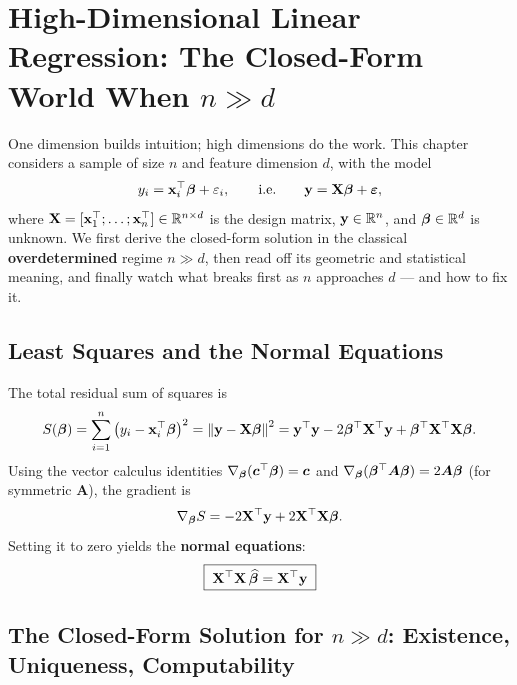 \section[High dimensions: the closed-form world]{High-Dimensional Linear Regression: The Closed-Form World When $n \gg d$}\label{sec:highdim}

One dimension builds intuition; high dimensions do the work. This chapter considers a sample of size $n$ and feature dimension $d$, with the model
\begin{equation}\label{eq:hd-model}
  y_i = \mathbf{x}_i^\top \bm{\beta} + \varepsilon_i,
  \qquad \text{i.e.} \qquad
  \mathbf{y} = \mathbf{X} \bm{\beta} + \bm{\varepsilon},
\end{equation}
where $\mathbf{X} = [\mathbf{x}_1^\top; \dots; \mathbf{x}_n^\top] \in \mathbb{R}^{n \times d}$ is the design matrix, $\mathbf{y} \in \mathbb{R}^n$, and $\bm{\beta} \in \mathbb{R}^d$ is unknown. We first derive the closed-form solution in the classical \textbf{overdetermined} regime $n \gg d$, then read off its geometric and statistical meaning, and finally watch what breaks first as $n$ approaches $d$ — and how to fix it.

\subsection{Least Squares and the Normal Equations}\label{sec:hd-ls}

The total residual sum of squares is
\begin{equation}\label{eq:hd-rss}
  S(\bm{\beta}) = \sum_{i=1}^n \big( y_i - \mathbf{x}_i^\top \bm{\beta} \big)^2 = \left\lVert \mathbf{y} - \mathbf{X} \bm{\beta} \right\rVert^2
  = \mathbf{y}^\top \mathbf{y} - 2 \bm{\beta}^\top \mathbf{X}^\top \mathbf{y} + \bm{\beta}^\top \mathbf{X}^\top \mathbf{X} \bm{\beta} .
\end{equation}
Using the vector calculus identities $\nabla_{\bm{\beta}}(\bm{c}^\top \bm{\beta}) = \bm{c}$ and $\nabla_{\bm{\beta}}(\bm{\beta}^\top \bm{A} \bm{\beta}) = 2\bm{A}\bm{\beta}$ (for symmetric $\bm{A}$), the gradient is
\begin{equation}\label{eq:hd-grad}
  \nabla_{\bm{\beta}} S = -2 \mathbf{X}^\top \mathbf{y} + 2 \mathbf{X}^\top \mathbf{X} \bm{\beta} .
\end{equation}
Setting it to zero yields the \textbf{normal equations}:
\begin{equation}\label{eq:normal-eq}
  \boxed{\;\mathbf{X}^\top \mathbf{X} \, \widehat{\bm{\beta}} = \mathbf{X}^\top \mathbf{y}\;}
\end{equation}

\subsection{The Closed-Form Solution for $n \gg d$: Existence, Uniqueness, Computability}\label{sec:hd-closed}

